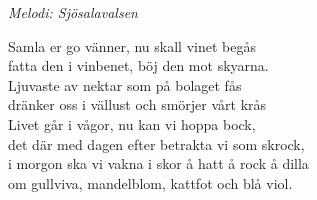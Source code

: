 {\footnotesize\textit{Melodi: Sjösalavalsen}}\par
\vspace{10pt}
Samla er go vänner, nu skall vinet begås\\
fatta den i vinbenet, böj den mot skyarna.\\
Ljuvaste av nektar som på bolaget fås\\
dränker oss i vällust och smörjer vårt krås\\
Livet går i vågor, nu kan vi hoppa bock,\\
det där med dagen efter betrakta vi som skrock,\\
i morgon ska vi vakna i skor å hatt å rock å dilla\\
om gullviva, mandelblom, kattfot och blå viol.
